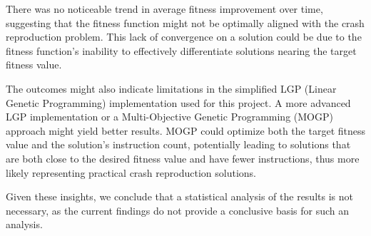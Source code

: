     There was no noticeable trend in average fitness improvement over time, suggesting that the fitness function might 
    not be optimally aligned with the crash reproduction problem. This lack of convergence on a solution could be due to 
    the fitness function's inability to effectively differentiate solutions nearing the target fitness value.

    The outcomes might also indicate limitations in the simplified LGP (Linear Genetic Programming) implementation used 
    for this project. A more advanced LGP implementation or a Multi-Objective Genetic Programming (MOGP) approach might 
    yield better results. MOGP could optimize both the target fitness value and the solution's instruction count, 
    potentially leading to solutions that are both close to the desired fitness value and have fewer instructions, thus 
    more likely representing practical crash reproduction solutions.

    Given these insights, we conclude that a statistical analysis of the results is not necessary, as the current 
    findings do not provide a conclusive basis for such an analysis.
